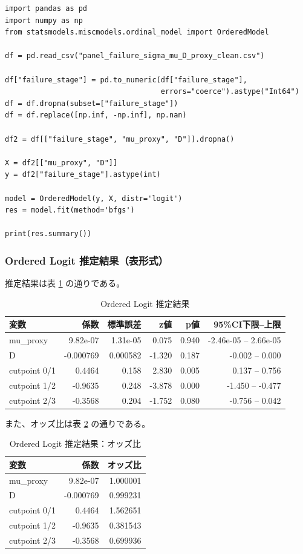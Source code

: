 \begin{verbatim}
import pandas as pd
import numpy as np
from statsmodels.miscmodels.ordinal_model import OrderedModel

df = pd.read_csv("panel_failure_sigma_mu_D_proxy_clean.csv")

df["failure_stage"] = pd.to_numeric(df["failure_stage"],
                                    errors="coerce").astype("Int64")
df = df.dropna(subset=["failure_stage"])
df = df.replace([np.inf, -np.inf], np.nan)

df2 = df[["failure_stage", "mu_proxy", "D"]].dropna()

X = df2[["mu_proxy", "D"]]
y = df2["failure_stage"].astype(int)

model = OrderedModel(y, X, distr='logit')
res = model.fit(method='bfgs')

print(res.summary())
\end{verbatim}

\subsubsection*{Ordered Logit 推定結果（表形式）}

推定結果は表 \ref{tab:ordered_logit_results} の通りである。

\begin{table}[H]
\centering
\caption{Ordered Logit 推定結果}
\label{tab:ordered_logit_results}
\begin{tabular}{lrrrrr}
\hline
変数 & 係数 & 標準誤差 & z値 & p値 & 95\%CI下限--上限 \\
\hline
mu\_proxy & 9.82e-07 & 1.31e-05 & 0.075 & 0.940 & -2.46e-05 -- 2.66e-05 \\
D & -0.000769 & 0.000582 & -1.320 & 0.187 & -0.002 -- 0.000 \\
cutpoint 0/1 & 0.4464 & 0.158 & 2.830 & 0.005 & 0.137 -- 0.756 \\
cutpoint 1/2 & -0.9635 & 0.248 & -3.878 & 0.000 & -1.450 -- -0.477 \\
cutpoint 2/3 & -0.3568 & 0.204 & -1.752 & 0.080 & -0.756 -- 0.042 \\
\hline
\end{tabular}
\end{table}

また、オッズ比は表 \ref{tab:ordered_logit_odds} の通りである。

\begin{table}[H]
\centering
\caption{Ordered Logit 推定結果：オッズ比}
\label{tab:ordered_logit_odds}
\begin{tabular}{lrr}
\hline
変数 & 係数 & オッズ比 \\
\hline
mu\_proxy & 9.82e-07 & 1.000001 \\
D & -0.000769 & 0.999231 \\
cutpoint 0/1 & 0.4464 & 1.562651 \\
cutpoint 1/2 & -0.9635 & 0.381543 \\
cutpoint 2/3 & -0.3568 & 0.699936 \\
\hline
\end{tabular}
\end{table}

